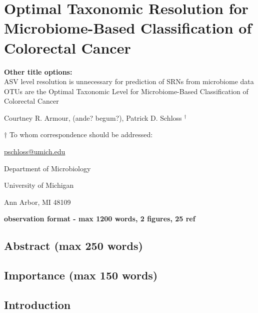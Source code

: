 \documentclass[
]{article}
\author{}
\date{\vspace{-2.5em}}
\begin{document}
\hypertarget{optimal-taxonomic-resolution-for-microbiome-based-classification-of-colorectal-cancer}{%
\section{Optimal Taxonomic Resolution for Microbiome-Based
Classification of Colorectal
Cancer}\label{optimal-taxonomic-resolution-for-microbiome-based-classification-of-colorectal-cancer}}

\vspace{20mm}

\textbf{Other title options:}\\
ASV level resolution is unnecessary for prediction of SRNs from
microbiome data\\
OTUs are the Optimal Taxonomic Level for Microbiome-Based Classification
of Colorectal Cancer

\vspace{10mm}

Courtney R. Armour, (ande? begum?), Patrick D. Schloss \({^\dagger}\)

\vspace{20mm}

\({\dagger}\) To whom correspondence should be addressed:

\href{mailto:pschloss@umich.edu}{pschloss@umich.edu}

Department of Microbiology

University of Michigan

Ann Arbor, MI 48109

\vspace{20mm}

\textbf{observation format - max 1200 words, 2 figures, 25 ref}

\newpage

\hypertarget{abstract-max-250-words}{%
\subsection{Abstract (max 250 words)}\label{abstract-max-250-words}}

\hypertarget{importance-max-150-words}{%
\subsection{Importance (max 150 words)}\label{importance-max-150-words}}

\newpage

\hypertarget{introduction}{%
\subsection{Introduction}\label{introduction}}
\end{document}
